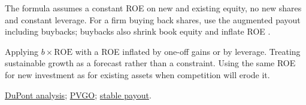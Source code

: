 \begin{qfmethod}
 The formula assumes a constant ROE on new and existing equity, no new shares and constant leverage. For a firm buying back shares, use the augmented payout including buybacks; buybacks also shrink book equity and inflate ROE \citep[pp.~333--334]{investment-valuation-2012}.

 Applying $b\times\mathrm{ROE}$ with a ROE inflated by one-off gains or by leverage. Treating sustainable growth as a forecast rather than a constraint. Using the same ROE for new investment as for existing assets when competition will erode it.

 \hyperref[meth:return-on-equity-decomposition]{DuPont analysis}; \hyperref[meth:pvgo-justified-pe]{PVGO}; \hyperref[meth:gordon-growth-model]{stable payout}.

\end{qfmethod}
